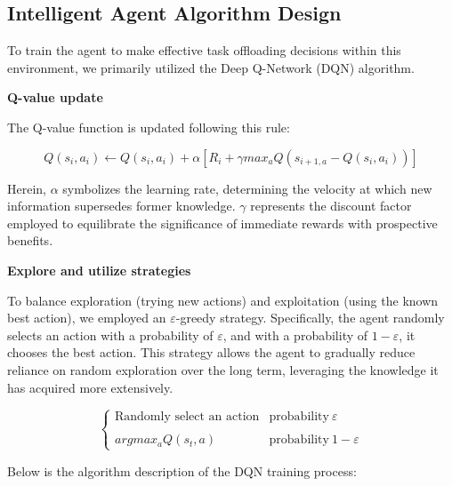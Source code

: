 \documentclass[preprint,12pt]{elsarticle}
\begin{document}
\subsection{Intelligent Agent Algorithm Design}
To train the agent to make effective task offloading decisions within this environment, we primarily utilized the Deep Q-Network (DQN) algorithm.

\textbf{Q-value update}

The Q-value function is updated following this rule:

\begin{equation}
    Q(s_i,a_i)\gets Q(s_i,a_i)+\alpha [R_i+\gamma max_aQ(s_{i+1,a}-Q(s_i,a_i))]
\end{equation}

Herein, \(\alpha\) symbolizes the learning rate, determining the velocity at which new information supersedes former knowledge. \(\gamma\) represents the discount factor employed to equilibrate the significance of immediate rewards with prospective benefits.

\textbf{Explore and utilize strategies}

To balance exploration (trying new actions) and exploitation (using the known best action), we employed an \(\varepsilon\)-greedy strategy. Specifically, the agent randomly selects an action with a probability of \(\varepsilon\), and with a probability of \(1-\varepsilon\), it chooses the best action. This strategy allows the agent to gradually reduce reliance on random exploration over the long term, leveraging the knowledge it has acquired more extensively.

\begin{equation}
    \left\{
        \begin{array}{ll}
            \text{Randomly select an action} & \text{probability}\ \varepsilon \\
            \\argmax_a Q(s_t, a) & \text{probability}\ 1 - \varepsilon
        \end{array}
    \right.
\end{equation}


Below is the algorithm description of the DQN training process:
\end{document}
